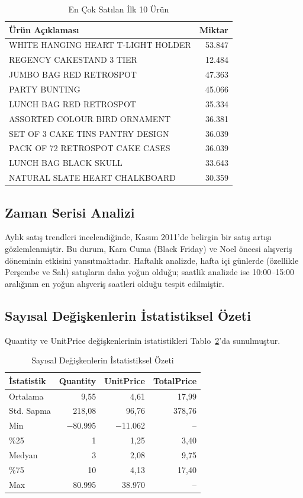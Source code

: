 \documentclass[conference]{IEEEtran}
\begin{document}
\begin{table}[h]
\centering
\caption{En Çok Satılan İlk 10 Ürün}
\label{tab:top_products}
\begin{tabular}{p{5.5cm}r}
\toprule
\textbf{Ürün Açıklaması} & \textbf{Miktar} \\
\midrule
WHITE HANGING HEART T-LIGHT HOLDER & 53.847 \\
REGENCY CAKESTAND 3 TIER & 12.484 \\
JUMBO BAG RED RETROSPOT & 47.363 \\
PARTY BUNTING & 45.066 \\
LUNCH BAG RED RETROSPOT & 35.334 \\
ASSORTED COLOUR BIRD ORNAMENT & 36.381 \\
SET OF 3 CAKE TINS PANTRY DESIGN & 36.039 \\
PACK OF 72 RETROSPOT CAKE CASES & 36.039 \\
LUNCH BAG BLACK SKULL & 33.643 \\
NATURAL SLATE HEART CHALKBOARD & 30.359 \\
\bottomrule
\end{tabular}
\end{table}

\subsection{Zaman Serisi Analizi}

Aylık satış trendleri incelendiğinde, Kasım 2011'de belirgin bir satış artışı gözlemlenmiştir. Bu durum, Kara Cuma (Black Friday) ve Noel öncesi alışveriş döneminin etkisini yansıtmaktadır. Haftalık analizde, hafta içi günlerde (özellikle Perşembe ve Salı) satışların daha yoğun olduğu; saatlik analizde ise 10:00--15:00 aralığının en yoğun alışveriş saatleri olduğu tespit edilmiştir.

\subsection{Sayısal Değişkenlerin İstatistiksel Özeti}

Quantity ve UnitPrice değişkenlerinin istatistikleri Tablo~\ref{tab:stats}'da sunulmuştur.

\begin{table}[h]
\centering
\caption{Sayısal Değişkenlerin İstatistiksel Özeti}
\label{tab:stats}
\begin{tabular}{lrrr}
\toprule
\textbf{İstatistik} & \textbf{Quantity} & \textbf{UnitPrice} & \textbf{TotalPrice} \\
\midrule
Ortalama & 9,55 & 4,61 & 17,99 \\
Std. Sapma & 218,08 & 96,76 & 378,76 \\
Min & $-$80.995 & $-$11.062 & -- \\
\%25 & 1 & 1,25 & 3,40 \\
Medyan & 3 & 2,08 & 9,75 \\
\%75 & 10 & 4,13 & 17,40 \\
Max & 80.995 & 38.970 & -- \\
\bottomrule
\end{tabular}
\end{table}
\end{document}

